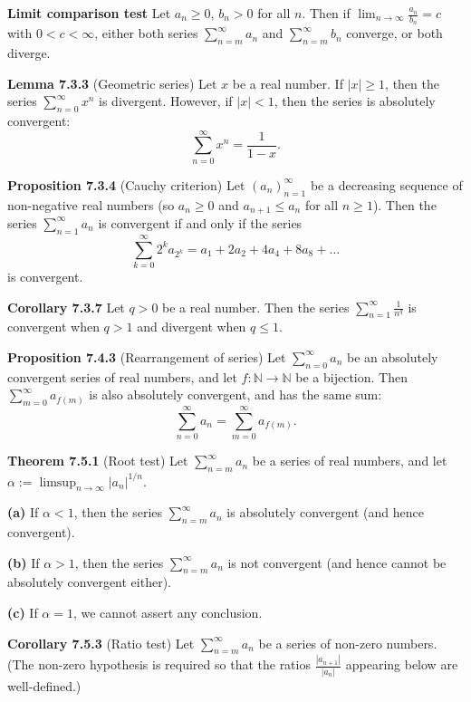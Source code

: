 \documentclass{article}
\begin{document}
\medskip

\textbf{Limit comparison test}
    Let $a_n \geq 0$, $b_n > 0$ for all $n$. Then if
    $\lim_{n \to \infty} \frac{a_n}{b_n} = c$ with $0 < c < \infty$,
    either both series $\sum_{n=m}^{\infty} a_n$ and
    $\sum_{n=m}^{\infty} b_n$ converge, or both diverge.

\medskip

\textbf{Lemma 7.3.3} (Geometric series) Let $x$ be a real number.
If $|x| \geq 1$, then the series $\sum_{n=0}^{\infty} x^n$ is divergent.
However, if $|x| < 1$, then the series is absolutely convergent:
\[
    \sum_{n=0}^{\infty} x^n = \frac{1}{1 - x}.
\]

\medskip

\textbf{Proposition 7.3.4} (Cauchy criterion) Let $(a_n)_{n=1}^{\infty}$ be a
decreasing sequence of non-negative real numbers (so $a_n \geq 0$ and
$a_{n+1} \leq a_n$ for all $n \geq 1$).
Then the series $\sum_{n=1}^{\infty} a_n$ is convergent if and only if the
series
\[
    \sum_{k=0}^{\infty} 2^k a_{2^k} = a_1 + 2a_2 + 4a_4 + 8a_8 + \dots
\]
is convergent.

\medskip

\textbf{Corollary 7.3.7} Let $q > 0$ be a real number. Then the series
$\sum_{n=1}^{\infty} \frac{1}{n^q}$ is convergent when $q > 1$ and divergent
when $q \leq 1$.

\medskip

\textbf{Proposition 7.4.3} (Rearrangement of series) Let $\sum_{n=0}^{\infty} a_n$
be an absolutely convergent series of real numbers, and let $f: \mathbb{N} \to \mathbb{N}$
be a bijection.
Then $\sum_{m=0}^{\infty} a_{f(m)}$ is also absolutely convergent, and has the
same sum:
\[
    \sum_{n=0}^{\infty} a_n = \sum_{m=0}^{\infty} a_{f(m)}.
\]

\medskip


\textbf{Theorem 7.5.1} (Root test) Let $\sum_{n=m}^{\infty} a_n$ be a series of real
numbers, and let $\alpha := \limsup_{n \to \infty} |a_n|^{1/n}$.

\textbf{(a)} If $\alpha < 1$, then the series $\sum_{n=m}^{\infty} a_n$ is absolutely
convergent (and hence convergent).

\textbf{(b)} If $\alpha > 1$, then the series $\sum_{n=m}^{\infty} a_n$ is not
convergent (and hence cannot be absolutely convergent either).

\textbf{(c)} If $\alpha = 1$, we cannot assert any conclusion.


\medskip


\textbf{Corollary 7.5.3} (Ratio test) Let $\sum_{n=m}^{\infty} a_n$ be a series of
non-zero numbers. (The non-zero hypothesis is required so that the ratios
$\frac{|a_{n+1}|}{|a_n|}$ appearing below are well-defined.)
\end{document}
